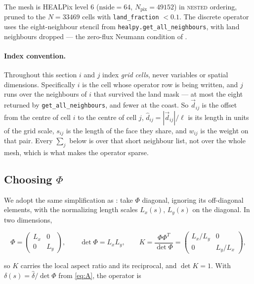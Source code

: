 \documentclass[11pt]{article}
\newcommand{\grid}{\ell}
\newcommand{\dhat}{\hat{\delta}}
\newcommand{\Npix}{N_{\mathrm{pix}}}
\begin{document}
The mesh is HEALPix level 6 ($\mathrm{nside}=64$, $\Npix = 49152$) in \textsc{nested}
ordering, pruned to the $N = 33469$ cells with \texttt{land\_fraction} $< 0.1$. The
discrete operator uses the eight-neighbour stencil from
\texttt{healpy.get\_all\_neighbours}, with land neighbours dropped --- the zero-flux
Neumann condition of \citet{smith2022}.

\paragraph{Index convention.} Throughout this section $i$ and $j$ index \emph{grid
cells}, never variables or spatial dimensions. Specifically $i$ is the cell whose
operator row is being written, and $j$ runs over the neighbours of $i$ that survived the
land mask --- at most the eight returned by \texttt{get\_all\_neighbours}, and fewer at
the coast. So $\vec{d}_{ij}$ is the offset from the centre of cell $i$ to the centre of
cell $j$, $\hat{d}_{ij} = |\vec{d}_{ij}|/\grid$ is its length in units of the grid
scale, $s_{ij}$ is the length of the face they share, and $w_{ij}$ is the weight on that
pair. Every $\sum_j$ below is over that short neighbour list, not over the whole mesh,
which is what makes the operator sparse.

\subsection{Choosing $\Phi$}
\label{sec:phi}

We adopt the same simplification as \citet[\S3.2]{smith2022}: take $\Phi$ diagonal,
ignoring its off-diagonal elements, with the normalizing length scales
$L_x(s)$, $L_y(s)$ on the diagonal. In two dimensions,

\begin{equation}
\label{eq:Phi}
\Phi = \begin{pmatrix} L_x & 0 \\ 0 & L_y \end{pmatrix},
\qquad
\det\Phi = L_x L_y,
\qquad
K = \frac{\Phi\Phi^{T}}{\det\Phi}
  = \begin{pmatrix} L_x/L_y & 0 \\ 0 & L_y/L_x \end{pmatrix},
\end{equation}

\noindent so $K$ carries the local aspect ratio and its reciprocal, and $\det K = 1$.
With $\delta(s) = \dhat/\det\Phi$ from \eqref{eq:A}, the operator is
\end{document}
